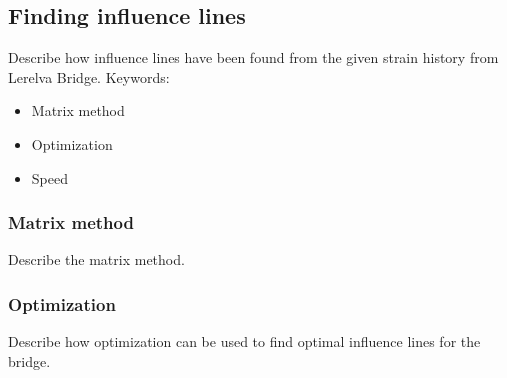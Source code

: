 \subsection{Finding influence lines}
Describe how influence lines have been found from the given strain history from Lerelva Bridge.
Keywords:
\begin{itemize}
\item Matrix method
\item Optimization
\item Speed
\end{itemize}
\subsubsection{Matrix method}
Describe the matrix method.

\subsubsection{Optimization}
Describe how optimization can be used to find optimal influence lines for the bridge.

